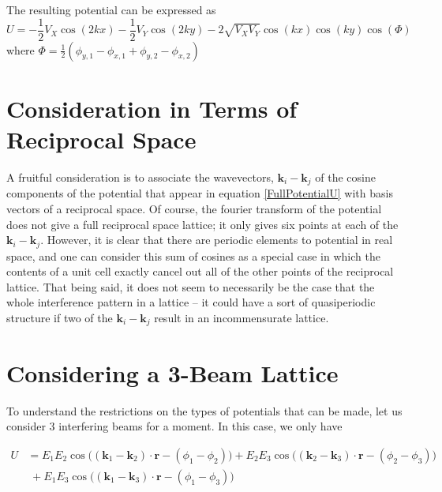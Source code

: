 \documentclass[11pt]{article}
\newcommand{\lef}{\left}
\newcommand{\rig}{\right}
\newcommand{\ph}{\phi}
\newcommand{\vk}{\mathbf{k}}
\newcommand{\vr}{\mathbf{r}}
\begin{document}
The resulting potential can be expressed as 
\[
U = -\frac{1}{2}V_X \cos(2kx) - \frac{1}{2}V_Y\cos(2ky) - 2\sqrt{V_XV_Y}\cos(kx)\cos(ky)\cos(\Phi)
\]
where $\Phi = \frac{1}{2}\lef(\ph_{y,1}-\ph_{x,1} + \ph_{y,2}-\ph_{x,2}\rig)$

\section{Consideration in Terms of Reciprocal Space}

A fruitful consideration is to associate the wavevectors, $\vk_i - \vk_j$ of the cosine components of the potential that appear in equation \eqref{FullPotentialU} with basis vectors of a reciprocal space.  Of course, the fourier transform of the potential does not give a full reciprocal space lattice; it only gives six points at each of the $\vk_i - \vk_j$.  However, it is clear that there are periodic elements to potential in real space, and one can consider this sum of cosines as a special case in which the contents of a unit cell exactly cancel out all of the other points of the reciprocal lattice.  That being said, it does not seem to necessarily be the case that the whole interference pattern in a lattice -- it could have a sort of quasiperiodic structure if two of the $\vk_i - \vk_j$ result in an incommensurate lattice.

\section{Considering a 3-Beam Lattice}

To understand the restrictions on the types of potentials that can be made, let us consider 3 interfering beams for a moment.  In this case, we only have 

\begin{equation}
\begin{split}
U &= E_{1}E_{2} \cos\Big((\vk_1-\vk_2) \cdot \vr - (\ph_1-\ph_2)\Big) + E_{2}E_{3} \cos\Big((\vk_2-\vk_3) \cdot \vr - (\ph_2-\ph_3)\Big)\\[1.4ex] 
&\;+E_{1}E_{3} \cos\Big((\vk_1-\vk_3) \cdot \vr - (\ph_1-\ph_3)\Big)
\end{split}
\end{equation}
\end{document}
